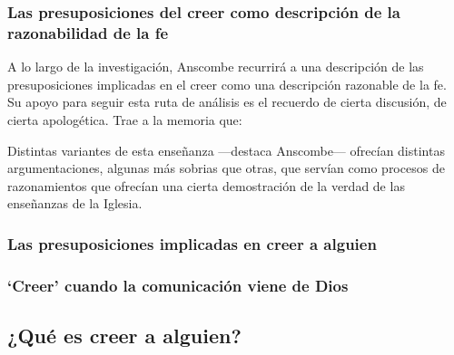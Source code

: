 \subsubsection{Las presuposiciones del creer como descripción de la
  razonabilidad de la fe}
A lo largo de la investigación, Anscombe recurrirá a una descripción de las
presuposiciones implicadas en el creer como una descripción razonable de la fe.
Su apoyo para seguir esta ruta de análisis es el recuerdo de cierta discusión,
de cierta apologética\autocite[Cf.~][13]{anscombe2008faith:faith}. Trae a la
memoria que: 

Distintas variantes de esta enseñanza ---destaca Anscombe--- ofrecían distintas
argumentaciones, algunas más sobrias que otras, que servían como procesos de
razonamientos que ofrecían una cierta demostración de la verdad de las
enseñanzas de la Iglesia\autocite[Cf.~][12]{anscombe2008faith:faith}.

\subsubsection{Las presuposiciones implicadas en creer a alguien}

\subsubsection{`Creer' cuando la comunicación viene de Dios}

\subsection{¿Qué es creer a alguien?}

